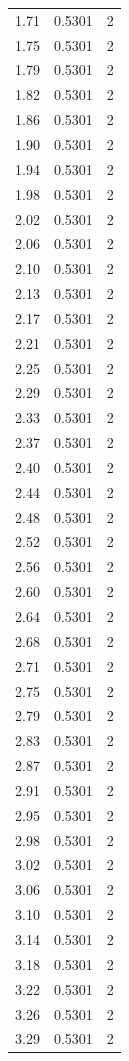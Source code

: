 \begin{longtable}{lrr}
  1.71 & 0.5301 & 2 \\
  1.75 & 0.5301 & 2 \\
  1.79 & 0.5301 & 2 \\
  1.82 & 0.5301 & 2 \\
  1.86 & 0.5301 & 2 \\
  1.90 & 0.5301 & 2 \\
  1.94 & 0.5301 & 2 \\
  1.98 & 0.5301 & 2 \\
  2.02 & 0.5301 & 2 \\
  2.06 & 0.5301 & 2 \\
  2.10 & 0.5301 & 2 \\
  2.13 & 0.5301 & 2 \\
  2.17 & 0.5301 & 2 \\
  2.21 & 0.5301 & 2 \\
  2.25 & 0.5301 & 2 \\
  2.29 & 0.5301 & 2 \\
  2.33 & 0.5301 & 2 \\
  2.37 & 0.5301 & 2 \\
  2.40 & 0.5301 & 2 \\
  2.44 & 0.5301 & 2 \\
  2.48 & 0.5301 & 2 \\
  2.52 & 0.5301 & 2 \\
  2.56 & 0.5301 & 2 \\
  2.60 & 0.5301 & 2 \\
  2.64 & 0.5301 & 2 \\
  2.68 & 0.5301 & 2 \\
  2.71 & 0.5301 & 2 \\
  2.75 & 0.5301 & 2 \\
  2.79 & 0.5301 & 2 \\
  2.83 & 0.5301 & 2 \\
  2.87 & 0.5301 & 2 \\
  2.91 & 0.5301 & 2 \\
  2.95 & 0.5301 & 2 \\
  2.98 & 0.5301 & 2 \\
  3.02 & 0.5301 & 2 \\
  3.06 & 0.5301 & 2 \\
  3.10 & 0.5301 & 2 \\
  3.14 & 0.5301 & 2 \\
  3.18 & 0.5301 & 2 \\
  3.22 & 0.5301 & 2 \\
  3.26 & 0.5301 & 2 \\
  3.29 & 0.5301 & 2 \\

\end{longtable}
